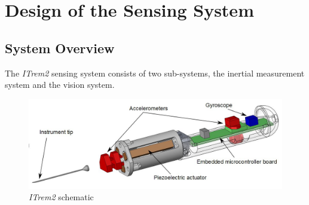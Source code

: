 \chapter{Design of the Sensing System}
\label{ch:System}

\section{System Overview}
\label{Sec:SystemOverview}

The \textit{ITrem2} sensing system consists of two sub-systems, the inertial measurement system and the vision system. 

\begin{figure}[htbp!]
 \centering
 \includegraphics[width=1\textwidth]{./Fig/Fig_InstrumentComponents.jpg}
 \caption{\textit{ITrem2} schematic}
 \label{Fig_InstrumentComponents}
\end{figure}

	
